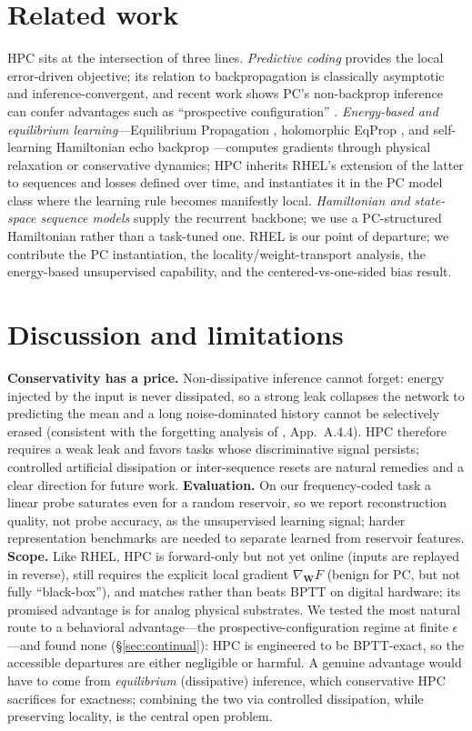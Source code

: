 \documentclass[10pt]{article}
\theoremstyle{remark}
\newcommand{\bW}{\mathbf{W}}
\newcommand{\eps}{\epsilon}
\newcommand{\grad}{\nabla}
\begin{document}
\section{Related work}
\label{sec:related}
HPC sits at the intersection of three lines. \emph{Predictive coding}
\citep{raoballard,whittingtonbogacz,millidge_review} provides the local
error-driven objective; its relation to backpropagation is classically
asymptotic and inference-convergent, and recent work shows PC's
non-backprop inference can confer advantages such as ``prospective
configuration'' \citep{prospective}. \emph{Energy-based and equilibrium
learning}---Equilibrium Propagation \citep{eqprop,scellier_compare},
holomorphic EqProp \citep{holomorphic}, and self-learning Hamiltonian echo
backprop \citep{heb}---computes gradients through physical relaxation or
conservative dynamics; HPC inherits RHEL's extension of the latter to
sequences and losses defined over time, and instantiates it in the PC model
class where the learning rule becomes manifestly local. \emph{Hamiltonian and
state-space sequence models} \citep{linoss,unicornn,s4,mamba} supply the
recurrent backbone; we use a PC-structured Hamiltonian rather than a
task-tuned one. RHEL \citep{rhel} is our point of departure; we contribute the
PC instantiation, the locality/weight-transport analysis, the energy-based
unsupervised capability, and the centered-vs-one-sided bias result.

\section{Discussion and limitations}
\label{sec:limitations}
\textbf{Conservativity has a price.} Non-dissipative inference cannot forget:
energy injected by the input is never dissipated, so a strong leak collapses
the network to predicting the mean and a long noise-dominated history cannot
be selectively erased (consistent with the forgetting analysis of
\citealp{rhel}, App.~A.4.4). HPC therefore requires a weak leak and favors
tasks whose discriminative signal persists; controlled artificial dissipation
or inter-sequence resets are natural remedies and a clear direction for
future work. \textbf{Evaluation.} On our frequency-coded task a linear probe
saturates even for a random reservoir, so we report reconstruction quality,
not probe accuracy, as the unsupervised learning signal; harder
representation benchmarks are needed to separate learned from reservoir
features. \textbf{Scope.} Like RHEL, HPC is forward-only but not yet online
(inputs are replayed in reverse), still requires the explicit local gradient
$\grad_{\bW}F$ (benign for PC, but not fully ``black-box''), and matches
rather than beats BPTT on digital hardware; its promised advantage is for
analog physical substrates. We tested the most natural route to a behavioral
advantage---the prospective-configuration regime at finite $\eps$---and found
none (\S\ref{sec:continual}): HPC is engineered to be BPTT-exact, so the
accessible departures are either negligible or harmful. A genuine advantage
would have to come from \emph{equilibrium} (dissipative) inference, which
conservative HPC sacrifices for exactness; combining the two via controlled
dissipation, while preserving locality, is the central open problem.
\end{document}
